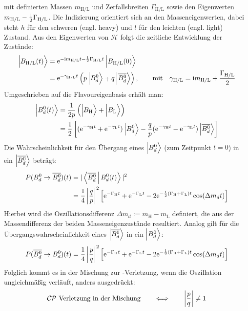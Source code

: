 mit definierten Massen $m_{\text{H/L}}$ und Zerfallsbreiten $\Gamma_{\text{H/L}}$ sowie den Eigenwerten  $m_{\text{H/L}}-\frac{\mathrm{i}}{2}\Gamma_{\text{H/L}}$. Die Indizierung orientiert sich an den Masseneigenwerten, dabei steht $h$ für den schweren (engl. heavy) und $l$ für den leichten (engl. light) Zustand. Aus den Eigenwerten von $\mathcal{H}$ folgt die zeitliche Entwicklung der Zustände:
\begin{align}
\nonumber \Ket{B_{\text{H/L}}(t)\vphantom{\text{\Bdbar}}} &= \e^{-\im m_{\text{H/L}}t-\frac{1}{2}\Gamma_{\text{H/L}}t}\Ket{B_{\text{H/L}}(0)\vphantom{\text{\Bdbar}}} \\
                           &= \e^{-\gamma_{\text{H/L}}t}\left(p\Ket{\text{\Bd}\vphantom{\text{\Bdbar}}} \mp q\Ket{\text{\Bdbar}}\right), \qquad
 \text{mit} \quad \gamma_{\text{H/L}} = \im m_{\text{H/L}}+\frac{\Gamma_{\text{H/L}}}{2}
\end{align}
Umgeschrieben auf die Flavoureigenbasis erhält man:
\begin{align}
\nonumber \Ket{\text{\Bd}(t)\vphantom{\text{\Bdbar}}} &= \frac{1}{2p}\left(\Ket{B_{\text{H}}\vphantom{\text{\Bdbar}}} + \Ket{B_{\text{L}}\vphantom{\text{\Bdbar}}}\right) \\
                       &= \frac{1}{2}\left[ (\e^{-\gamma_{\text{H}} t}+\e^{-\gamma_{\text{L}} t})\Ket{\text{\Bd}\vphantom{\text{\Bdbar}}} - \frac{q}{p}(\e^{-\gamma_{\text{H}} t}-\e^{-\gamma_{\text{L}} t})\Ket{\text{\Bdbar}}\right] \label{eg:b(t)}
\end{align}
Die Wahrscheinlichkeit für den Übergang eines $\Ket{\text{\Bd}\vphantom{\text{\Bdbar}}}$ (zum Zeitpunkt $t=0$) in ein $\Ket{\text{$\overline{B_d^0}$}}$ beträgt:
\begin{align}
\nonumber P(\text{$B_d^0$}\rightarrow\text{$\overline{B_d^0}$})(t) &= |\Braket{\text{$\overline{B_d^0}$}|\text{$B_d^0$}(t)}|^2 \\
                                        &= \frac{1}{4} \left|\frac{q}{p}\right|^2 \left[\mathrm{e}^{-\Gamma_{\text{H}} t} + \mathrm{e}^{-\Gamma_{\text{L}} t} - 2\mathrm{e}^{-\frac{1}{2}(\Gamma_{\text{H}} + \Gamma_{\text{L}}) t}\cos(\Delta m_d t)\right]
\end{align}
Hierbei wird die Oszillationsdifferenz $\Delta m_d := m_{\text{H}} - m_{\text{L}}$ definiert, die aus der Massendifferenz der beiden Masseneigenzustände resultiert. Analog gilt für die Übergangswahrscheinlichkeit eines $\Ket{\text{$\overline{B_d^0}$}}$ in ein $\Ket{\text{\Bd}\vphantom{\text{\Bdbar}}}$:
\begin{align}
P(\text{$\overline{B_d^0}$}\rightarrow \text{$B_d^0$})(t) = \frac{1}{4} \left|\frac{p}{q}\right|^2 \left[\mathrm{e}^{-\Gamma_{\text{H}} t} + \mathrm{e}^{-\Gamma_{\text{L}} t} - 2\mathrm{e}^{-\frac{1}{2}(\Gamma_{\text{H}} + \Gamma_{\text{L}}) t}\cos(\Delta m_d t)\right] 
\end{align}
Folglich kommt es in der Mischung zur \CP-Verletzung, wenn die Oszillation ungleichmäßig verläuft, anders ausgedrückt:
\begin{align}
\text{$\mathcal{CP}$-Verletzung in der Mischung} \qquad \Longleftrightarrow \qquad \left|\frac{p}{q}\right| \neq 1 
\end{align}

